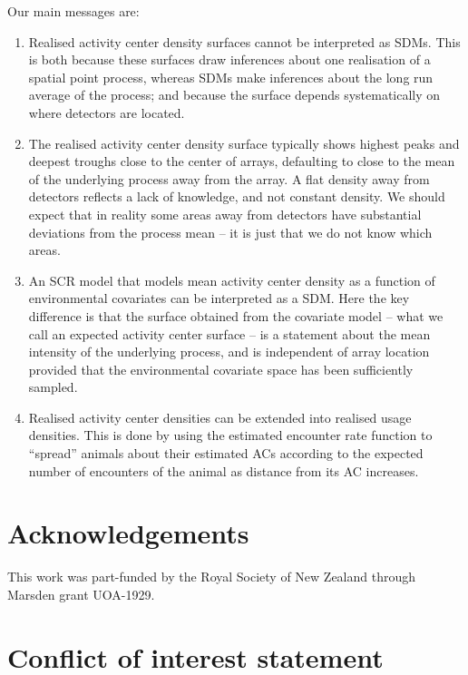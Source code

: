 \documentclass[10pt,a4paper]{article}
\begin{document}
Our main messages are:
\begin{enumerate}
\item Realised activity center density surfaces cannot be interpreted as SDMs. This is both because these surfaces draw inferences about one realisation of a spatial point process, whereas SDMs make inferences about the long run average of the process; and because the surface depends systematically on where detectors are located.
\item The realised activity center density surface typically shows highest peaks and deepest troughs close to the center of arrays, defaulting to close to the mean of the underlying process away from the array. A flat density away from detectors reflects a lack of knowledge, and not constant density. We should expect that in reality some areas away from detectors have substantial deviations from the process mean -- it is just that we do not know which areas.

\item An SCR model that models mean activity center density as a function of environmental covariates can be interpreted as a SDM. Here the key difference is that the surface obtained from the covariate model -- what we call an expected activity center surface -- is a statement about the mean intensity of the underlying process, and is independent of array location provided that the environmental covariate space has been sufficiently sampled.

\item Realised activity center densities can be extended into realised usage densities. This is done by using the estimated encounter rate function to ``spread'' animals about their estimated ACs according to the expected number of encounters of the animal as distance from its AC increases. 
\end{enumerate}


\section*{Acknowledgements}

This work was part-funded by the Royal Society of New Zealand through Marsden grant UOA-1929.

\section*{Conflict of interest statement}
\end{document}

